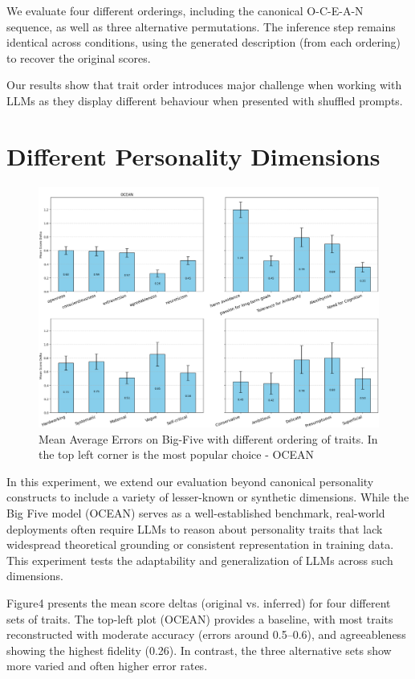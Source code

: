 \documentclass[12pt]{article}
\begin{document}
We evaluate four different orderings, including the canonical O-C-E-A-N sequence, as well as three alternative permutations. The inference step remains identical across conditions, using the generated description (from each ordering) to recover the original scores.

Our results show that trait order introduces major challenge when working with LLMs as they display different behaviour when presented with shuffled prompts. 


\section{Different Personality Dimensions}
\begin{figure}[h]
    \centering
    \includegraphics[width=0.9\linewidth]{diff_traits.png}
    \caption{Mean Average Errors on Big-Five with different ordering of traits. In the top left corner is the most popular choice - OCEAN}
    \label{fig:enter-label}
\end{figure}
In this experiment, we extend our evaluation beyond canonical personality constructs to include a variety of lesser-known or synthetic dimensions. While the Big Five model (OCEAN) serves as a well-established benchmark, real-world deployments often require LLMs to reason about personality traits that lack widespread theoretical grounding or consistent representation in training data. This experiment tests the adaptability and generalization of LLMs across such dimensions.

Figure4 presents the mean score deltas (original vs. inferred) for four different sets of traits. The top-left plot (OCEAN) provides a baseline, with most traits reconstructed with moderate accuracy (errors around 0.5–0.6), and agreeableness showing the highest fidelity (0.26). In contrast, the three alternative sets show more varied and often higher error rates.
\end{document}
